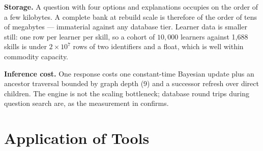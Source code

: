 

\textbf{Storage.} A question with four options and explanations occupies on the
order of a few kilobytes. A complete bank at rebuild scale is therefore of the
order of tens of megabytes --- immaterial against any database tier. Learner
data is smaller still: one row per learner per skill, so a cohort of
$10{,}000$ learners against 1{,}688 skills is under $2\times10^7$ rows of two
identifiers and a float, which is well within commodity capacity.

\textbf{Inference cost.} One response costs one constant-time Bayesian update
plus an ancestor traversal bounded by graph depth (9) and a successor refresh
over direct children. The engine is not the scaling bottleneck; database round
trips during question search are, as the measurement in 
confirms.

\section{Application of Tools}
\label{sec:tools}

